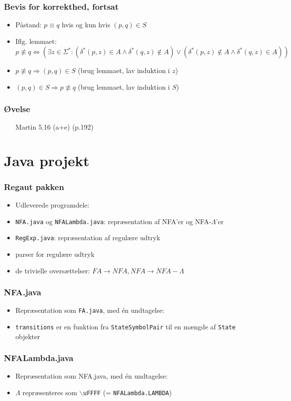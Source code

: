 \documentclass[]{beamer}
\begin{document}
\begin{frame}
\frametitle{Bevis for korrekthed, fortsat}
\begin{itemize}[<+->]
\item Påstand:  $p \equiv q$ hvis og kun hvis $(p, q)\in S$
\item
Iflg. lemmaet:\\
$p \not\equiv q \Leftrightarrow (\exists z\in \Sigma^*:  (\delta^*(p, z)\in A \wedge \delta^*(q, z)\not\in A) 
\vee  (\delta^*(p, z)\not\in A \wedge  \delta^*(q, z)\in A))$
\item
$p \not\equiv q \Rightarrow (p, q)\in S$    (brug lemmaet, lav induktion i $z$)
\item
$(p, q)\in S \Rightarrow p \not\equiv q$     (brug lemmaet, lav induktion i $S$)
\end{itemize}
\end{frame}

\begin{frame}
\frametitle{Øvelse}
\begin{itemize}
\item [Martin] 5.16 (a+e) (p.192)
\end{itemize}
\end{frame}

\section{Java projekt}
\begin{frame}
\frametitle{Regaut pakken}
\begin{itemize}[<+->]
\item Udleverede programdele:
\item \texttt{NFA.java} og \texttt{NFALambda.java}:
	repræsentation af NFA’er og NFA-$\Lambda$’er
\item \texttt{RegExp.java}:
	repræsentation af regulære udtryk
\item parser for regulære udtryk
\item de trivielle oversættelser: $FA \rightarrow  NFA, NFA \rightarrow  NFA-\Lambda$
\end{itemize}
\end{frame}
\begin{frame}
\frametitle{NFA.java}
\begin{itemize}[<+->]
\item Repræsentation som \texttt{FA.java}, med én undtagelse:
	
\item \texttt{transitions} er en funktion fra \texttt{StateSymbolPair}
  til en \alert{mængde} af \texttt{State} objekter
\end{itemize}
\end{frame}
\begin{frame}
\frametitle{NFALambda.java}
\begin{itemize}[<+->]
\item Repræsentation som NFA.java, med én undtagelse:
\item $\Lambda$ repræsenteres som \texttt{$\backslash$uFFFF}  (= \texttt{NFALambda.LAMBDA})
\end{itemize}
\end{frame}
\end{document}
